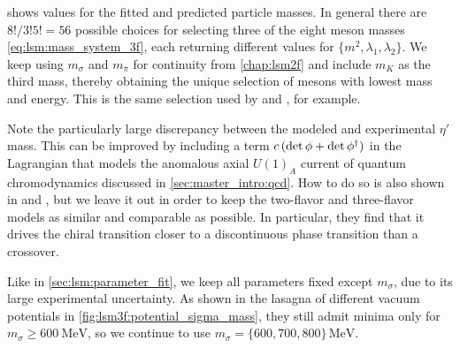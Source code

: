  shows values for the fitted and predicted particle masses.
In general there are $8!/3!5! = 56$ possible choices for selecting three of the eight meson masses \eqref{eq:lsm:mass_system_3f},
each returning different values for $\{m^2,\lambda_1,\lambda_2\}$.
We keep using $m_\sigma$ and $m_\pi$ for continuity from \cref{chap:lsm2f}
and include $m_K$ as the third mass, thereby obtaining the unique selection of mesons with lowest mass and energy.
This is the same selection used by \cite{ref:lsm3f} and \cite{ref:lsm3f_details}, for example.

Note the particularly large discrepancy between the modeled and experimental $\eta'$ mass.
This can be improved by including a term $c \, (\operatorname{det}{\phi} + \operatorname{det}{\phi^\dagger})$ in the Lagrangian
that models the anomalous axial $U(1)_A$ current of quantum chromodynamics discussed in \cref{sec:master_intro:qcd}.
How to do so is also shown in \cite{ref:lsm3f} and \cite{ref:lsm3f_details},
but we leave it out in order to keep the two-flavor and three-flavor models as similar and comparable as possible.
In particular, they find that it drives the chiral transition closer to a discontinuous phase transition than a crossover.

Like in \cref{sec:lsm:parameter_fit},
we keep all parameters fixed except $m_\sigma$, due to its large experimental uncertainty.
As shown in the lasagna of different vacuum potentials in \cref{fig:lsm3f:potential_sigma_mass},
they still admit minima only for $m_\sigma \geq \SI{600}{\mega\electronvolt}$,
so we continue to use $m_\sigma=\{600,700,800\} \, \si{\mega\electronvolt}$.


